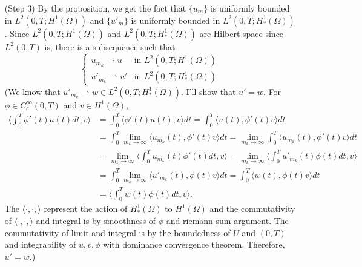 \documentclass{article}
\newtheorem{proposition}{Proposition}
\begin{document}
\begin{enumerate}
For now, I'll accept the proposition:
\begin{proposition}
For each $u_m$ satisfies
\begin{equation*}
\max_{t\in [0,T]}\norm{u_m(t)}_{L^2(\Omega)}+\norm{u_m(t)}_{L^2(0, t;H^1(\Omega))}+\norm{u'_m}_{L^2(0,T;H	_*^1(\Omega))}\leq C\left(\norm{f}_{L^2(0,T;L^2(\Omega))}+\norm{g}_{L^2(\Omega)}\right)
\end{equation*}
for some constant $C$ depending only on $\Omega,T$.
\end{proposition}
\item[(Step 3)]
By the proposition, we get the fact that $\{u_m\}$ is uniformly bounded in $L^2(0,T;H^1(\Omega))$ and $\{u'_m\}$ is uniformly bounded in $L^2(0,T;H	_*^1(\Omega))$. Since $L^2(0,T;H^1(\Omega))$ and $L^2(0,T;H	_*^1(\Omega))$ are Hilbert space since $L^2(0,T)$ is, there is a subsequence such that
\begin{equation*}
\begin{cases}
u_{m_k}\rightharpoonup u & \text{in }L^2(0,T;H^1(\Omega)) \\
u'_{m_k}\rightharpoonup u' & \text{in }L^2(0,T;H	_*^1(\Omega))
\end{cases}
\end{equation*}
(We know that $u'_{m_k}\rightharpoonup w\in L^2(0,T;H	_*^1(\Omega))$. I'll show that $u'=w$. For $\phi\in C^\infty_c(0,T)$ and $v\in H^1(\Omega)$,
\begin{equation*}
\begin{split}
\langle \int_0^T \phi'(t)u(t) dt,v\rangle&=\int_0^T  \langle \phi'(t)u(t), v\rangle dt =\int_0^T  \langle u(t), \phi'(t)v\rangle dt\\
&=\int_0^T  \lim\limits_{m_k\rightarrow\infty}\langle u_{m_k}(t), \phi'(t)v\rangle dt =\lim\limits_{m_k\rightarrow\infty}\int_0^T \langle u_{m_k}(t), \phi'(t)v\rangle dt \\
&=\lim\limits_{m_k\rightarrow\infty}\langle\int_0^T  u_{m_k}(t)\phi'(t) dt, v\rangle =\lim\limits_{m_k\rightarrow\infty}\langle\int_0^T  u'_{m_k}(t)\phi(t) dt, v\rangle \\
&=\int_0^T  \lim\limits_{m_k\rightarrow\infty}\langle u'_{m_k}(t), \phi(t)v\rangle dt =\int_0^T \langle w(t), \phi(t)v\rangle dt \\
&=\langle\int_0^T  w(t)\phi(t) dt, v\rangle.
\end{split}
\end{equation*}
The $\langle\cdot,\cdot,\rangle$ represent the action of $H^1_*(\Omega)$ to $H^1(\Omega)$ and the commutativity of $\langle\cdot,\cdot,\rangle$ and integral is by smoothness of $\phi$ and riemann sum argument. The commutativity of limit and integral is by the boundedness of $U$ and $(0,T)$ and integrability of $u,v,\phi$ with dominance convergence theorem. Therefore, $u'=w$.)


\end{enumerate}
\end{document}
